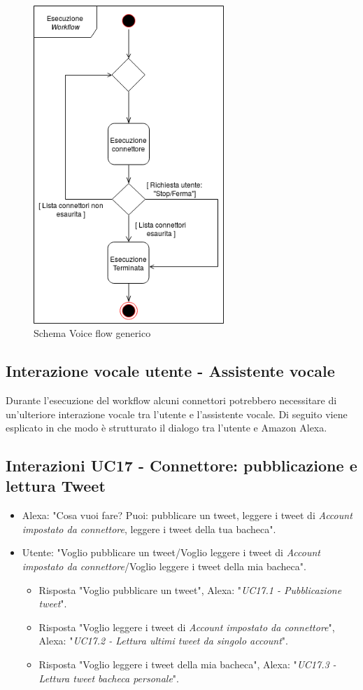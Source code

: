 \begin{figure}[H]
	\centering
	\includegraphics[height=12cm]{../includes/pics/esecuzione_connettore.png}
	\caption{\label{fig:mission}Schema Voice flow generico}
\end{figure}
\subsection{Interazione vocale utente - Assistente vocale}
\label{sec:iterazione_vocale_utente}
Durante l'esecuzione del workflow alcuni connettori potrebbero necessitare di un'ulteriore interazione vocale tra l'utente e l'assistente vocale. Di seguito viene esplicato in che modo è strutturato il dialogo tra l'utente e Amazon Alexa.

\subsection{Interazioni UC17 - Connettore: pubblicazione e lettura Tweet}
\label{sec:connettore_twitter}
 \begin{itemize}
        \item Alexa: "Cosa vuoi fare? Puoi: pubblicare un tweet, leggere i tweet di {\it Account impostato da connettore}, leggere i tweet della tua bacheca".
        \item Utente: "Voglio pubblicare un tweet/Voglio leggere i tweet di {\it Account impostato da connettore}/Voglio leggere i tweet della mia bacheca".
        \begin{itemize}
         \item{Risposta "Voglio pubblicare un tweet"}, Alexa: "{\it UC17.1 - Pubblicazione tweet}".
         \item{Risposta "Voglio leggere i tweet di {\it Account impostato da connettore}"}, Alexa: "{\it UC17.2 - Lettura ultimi tweet da singolo account}".
         \item{Risposta "Voglio leggere i tweet della mia bacheca"}, Alexa: "{\it UC17.3 - Lettura tweet bacheca personale}".
         \end{itemize}
    \end{itemize}


